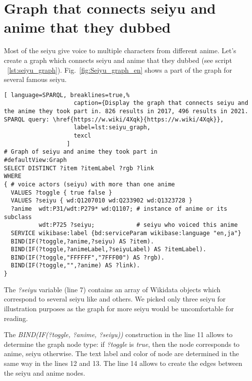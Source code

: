 \section{Graph that connects seiyu and anime that they dubbed}

Most of the seiyu give voice to multiple characters from different anime. Let's create a graph which connects seiyu and anime that they dubbed (see script ~\ref{lst:seiyu_graph}). Fig.~\ref{fig:Seiyu_graph_en} shows a part of the graph for several famous seiyu.

\begin{widepar}%
\captionsetup[lstlisting]{format=llapwide18}%
%
\begin{lstlisting}[ language=SPARQL, breaklines=true,%
                    caption={Display the graph that connects seiyu and the anime they took part in. 826 results in 2017, 496 results in 2021. SPARQL query: \href{https://w.wiki/4Xqk}{https://w.wiki/4Xqk}},
                    label=lst:seiyu_graph,
                    texcl
                  ]
# Graph of seiyu and anime they took part in
#defaultView:Graph
SELECT DISTINCT ?item ?itemLabel ?rgb ?link
WHERE
{ # voice actors (seiyu) with more than one anime
  VALUES ?toggle { true false }
  VALUES ?seiyu { wd:Q1207010 wd:Q233902 wd:Q1323728 }
  ?anime  wdt:P31/wdt:P279* wd:Q1107; # instance of anime or its subclass
          wdt:P725 ?seiyu;            # seiyu who voiced this anime 
  SERVICE wikibase:label {bd:serviceParam wikibase:language "en,ja"}
  BIND(IF(?toggle,?anime,?seiyu) AS ?item).
  BIND(IF(?toggle,?animeLabel,?seiyuLabel) AS ?itemLabel).
  BIND(IF(?toggle,"FFFFFF","7FFF00") AS ?rgb).
  BIND(IF(?toggle,"",?anime) AS ?link).
}
\end{lstlisting}%
\end{widepar}%

The \emph{?seiyu} variable (line 7) contains an array of Wikidata objects which correspond to several seiyu like  and others. We picked only three seiyu for illustration purposes as the graph for more seiyu would be uncomfortable for reading.

The \emph{BIND(IF(?toggle, ?anime, ?seiyu))} construction in the line \num{11} allows to determine the graph node type: if \emph{?toggle} is \emph{true}, then the node corresponds to anime, seiyu otherwise. The text label and color of node are determined in the same way in the lines \num{12} and \num{13}. The line \num{14} allows to create the edges between the seiyu and anime nodes.

